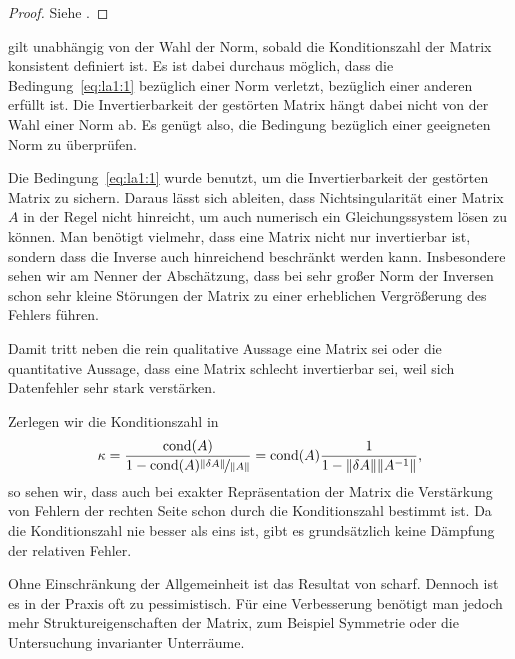 \begin{proof}
  Siehe \cite[Satz 4.1]{Rannacher17}.
\end{proof}

\begin{remark}
   gilt unabhängig von der Wahl der
  Norm, sobald die Konditionszahl der Matrix konsistent definiert
  ist. Es ist dabei durchaus möglich, dass die
  Bedingung~\eqref{eq:la1:1} bezüglich einer Norm verletzt, bezüglich
  einer anderen erfüllt ist. Die Invertierbarkeit der gestörten Matrix
  hängt dabei nicht von der Wahl einer Norm ab. Es genügt also, die
  Bedingung bezüglich einer geeigneten Norm zu überprüfen.
\end{remark}

\begin{remark}
  Die Bedingung~\eqref{eq:la1:1} wurde benutzt, um die
  Invertierbarkeit der gestörten Matrix zu sichern. Daraus lässt sich
  ableiten, dass Nichtsingularität einer Matrix $A$ in der Regel nicht
  hinreicht, um auch numerisch ein Gleichungssystem lösen zu
  können. Man benötigt vielmehr, dass eine Matrix nicht nur
  invertierbar ist, sondern dass die Inverse auch hinreichend
  beschränkt werden kann. Insbesondere sehen wir am Nenner der
  Abschätzung, dass bei sehr großer Norm der Inversen schon sehr
  kleine Störungen der Matrix zu einer erheblichen Vergrößerung des
  Fehlers führen.

  Damit tritt neben die rein qualitative Aussage eine Matrix sei
   oder  die quantitative
  Aussage, dass eine Matrix schlecht invertierbar sei, weil sich
  Datenfehler sehr stark verstärken.

  Zerlegen wir die Konditionszahl in
  \begin{gather}
    \kappa = \frac{\operatorname{cond}(A)}{1-\operatorname{cond}(A)\nicefrac{\lVert\delta A\rVert}{\lVert A\rVert}}
    =\operatorname{cond}(A)\frac{1}{1-\lVert\delta A\rVert{\lVert A^{-1}\rVert}},
  \end{gather}
  so sehen wir, dass auch bei exakter Repräsentation der Matrix die
  Verstärkung von Fehlern der rechten Seite schon durch die
  Konditionszahl bestimmt ist. Da die Konditionszahl nie besser als
  eins ist, gibt es grundsätzlich keine Dämpfung der relativen Fehler.
\end{remark}

\begin{remark}
  Ohne Einschränkung der Allgemeinheit ist das Resultat von
   scharf. Dennoch ist es in der Praxis
  oft zu pessimistisch. Für eine Verbesserung benötigt man jedoch mehr
  Struktureigenschaften der Matrix, zum Beispiel Symmetrie oder die
  Untersuchung invarianter Unterräume.
\end{remark}



